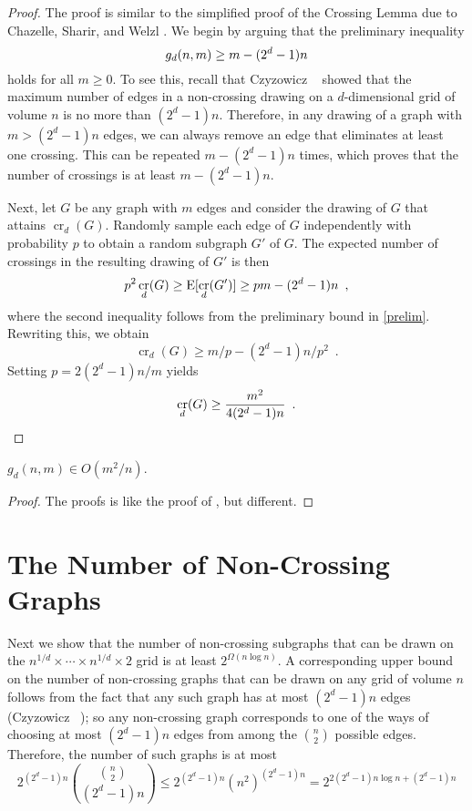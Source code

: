 \documentclass{patmorin}
\DeclareMathOperator{\crs}{cr}
\begin{document}
\begin{proof}
  The proof is similar to the simplified proof of the Crossing Lemma
  due to Chazelle, Sharir, and Welzl \cite{S}.  We begin by arguing that
  the preliminary inequality 
  \begin{equation}
    g_d(n,m) \ge m - (2^d-1)n  \eqlabel{prelim}
  \end{equation}
  holds for all $m \ge 0$.  To see this, recall that Czyzowicz \etal\
  \cite{s} showed that the maximum number of edges in a non-crossing
  drawing on a $d$-dimensional grid of volume $n$ is no more than
  $(2^d-1)n$.  Therefore, in any drawing of a graph with $m> (2^d-1)n$
  edges, we can always remove an edge that eliminates at least one
  crossing.  This can be repeated $m-(2^d-1)n$ times, which proves that
  the number of crossings is at least $m-(2^d-1)n$.

  Next, let $G$ be any graph with $m$ edges and consider the drawing
  of $G$ that attains $\crs_d(G)$.  Randomly sample each edge of $G$
  independently with probability $p$ to obtain a random subgraph $G'$
  of $G$.  The expected number of crossings in the resulting drawing of
  $G'$ is then
  \[  p^2\crs_d(G) \ge \E[\crs_d(G')] \ge pm - (2^d-1)n \enspace ,\] 
  where the second inequality follows from the preliminary bound
  in \eqref{prelim}.  Rewriting this, we obtain
  \[  \crs_d(G) \ge m/p - (2^d-1)n/p^2 \enspace . \]
  Setting $p=2(2^{d}-1)n/m$ yields
  \[  \crs_d(G) \ge \frac{m^2}{4(2^{d}-1)n} \enspace .  \qedhere \]
\end{proof}


\begin{thm}
  $g_d(n,m)\in O(m^2/n)$.
\end{thm}

\begin{proof}
The proofs is like the proof of , but different.
\end{proof}

\section{The Number of Non-Crossing Graphs}

Next we show that the number of non-crossing subgraphs that can be drawn 
on the $n^{1/d}\times \cdots\times n^{1/d}\times 2$ grid is at
least $2^{\Omega(n\log n)}$.  A corresponding upper bound on the number of
non-crossing graphs that can be drawn on any grid of volume $n$ follows
from the fact that any such graph has at most $(2^d-1)n$ edges (Czyzowicz
\etal\ \cite[Lemma Y]{X}); so any non-crossing graph corresponds to one
of the ways of choosing at most $(2^d-1)n$ edges from among the $\binom{n}{2}$
possible edges.  Therefore, the number of such graphs is at most
\[
    2^{(2^d-1)n}\binom{\binom{n}{2}}{(2^d-1)n} \le 2^{(2^d-1)n} (n^{2})^{(2^d-1)n} = 2^{2(2^d-1)n\log n+(2^d-1)n}
\]
\end{document}
